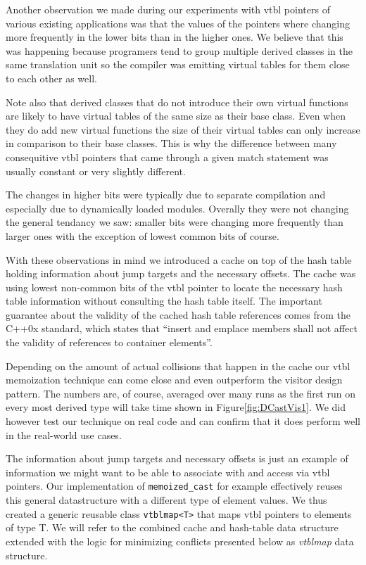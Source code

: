 \documentclass[preprint]{sigplanconf}
\makeatletter
\DeclareRobustCommand{\code}[1]{{\lstinline[breaklines=false,escapechar=@]{#1}}}
\makeatother
\begin{document}
Another observation we made during our experiments with vtbl pointers of various 
existing applications was that the values of the pointers where changing more 
frequently in the lower bits than in the higher ones. We believe that this was 
happening because programers tend to group multiple derived classes in the same 
translation unit so the compiler was emitting virtual tables for them close to 
each other as well. 

Note also that derived classes that do not introduce their own virtual functions 
are likely to have virtual tables of the same size as their base class. Even 
when they do add new virtual functions the size of their virtual tables can only 
increase in comparison to their base classes. This is why the difference between 
many consequitive vtbl pointers that came through a given match statement was 
usually constant or very slightly different.

The changes in higher bits were typically due to separate compilation and 
especially due to dynamically loaded modules. Overally they were not changing 
the general tendancy we saw: smaller bits were changing more frequently than 
larger ones with the exception of lowest common bits of course.

With these observations in mind we introduced a cache on top of the hash table 
holding information about jump targets and the necessary offsets. The cache was 
using lowest non-common bits of the vtbl pointer to locate the necessary hash 
table information without consulting the hash table itself. The important 
guarantee about the validity of the cached hash table references comes from the 
C++0x standard, which states that ``insert and emplace members shall not affect 
the validity of references to container elements''\cite[.5(13)]{C++0x}. 

Depending on the amount of actual collisions that happen in the cache our vtbl 
memoization technique can come close and even outperform the visitor design 
pattern. The numbers are, of course, averaged over many runs as the first run on 
every most derived type will take time shown in Figure\ref{fig:DCastVis1}. We 
did however test our technique on real code and can confirm that it does perform 
well in the real-world use cases.

The information about jump targets and necessary offsets is just an example of 
information we might want to be able to associate with and access via vtbl 
pointers. Our implementation of \code{memoized_cast} for example effectively 
reuses this general datastructure with a different type of element values. 
We thus created a generic reusable class \code{vtblmap<T>} that maps vtbl 
pointers to elements of type T. We will refer to the combined cache and 
hash-table data structure extended with the logic for minimizing conflicts 
presented below as \emph{vtblmap} data structure.
\end{document}
